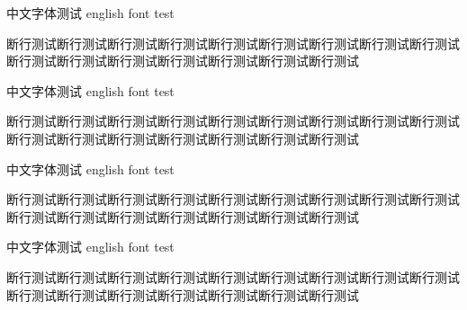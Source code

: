 \begin{lemma}
中文字体测试 english font test\par
断行测试断行测试断行测试断行测试断行测试断行测试断行测试断行测试断行测试断行测试断行测试断行测试断行测试断行测试断行测试断行测试\par
\end{lemma}


\begin{corollary}
中文字体测试 english font test\par
断行测试断行测试断行测试断行测试断行测试断行测试断行测试断行测试断行测试断行测试断行测试断行测试断行测试断行测试断行测试断行测试\par
\end{corollary}

\begin{example}
中文字体测试 english font test\par
断行测试断行测试断行测试断行测试断行测试断行测试断行测试断行测试断行测试断行测试断行测试断行测试断行测试断行测试断行测试断行测试\par
\end{example}

\begin{remark}
中文字体测试 english font test\par
断行测试断行测试断行测试断行测试断行测试断行测试断行测试断行测试断行测试断行测试断行测试断行测试断行测试断行测试断行测试断行测试\par
\end{remark}


